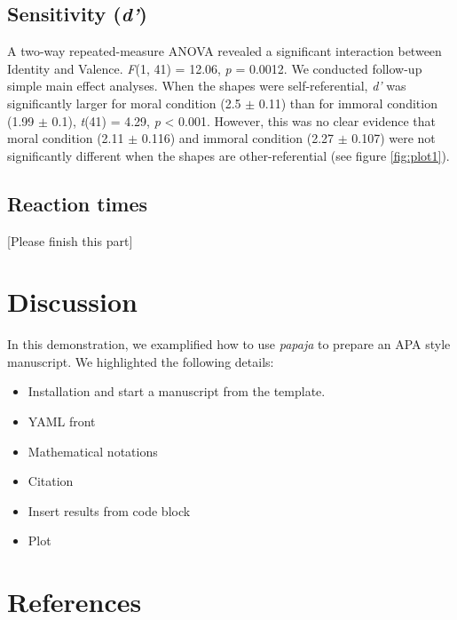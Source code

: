 \documentclass[
  man]{apa6}
\providecommand{\tightlist}{%
  \setlength{\itemsep}{0pt}\setlength{\parskip}{0pt}}
\begin{document}
\hypertarget{sensitivity-d}{%
\subsection{\texorpdfstring{Sensitivity (\emph{d'})}{Sensitivity (d')}}\label{sensitivity-d}}

A two-way repeated-measure ANOVA revealed a significant interaction between Identity and Valence. \emph{F}(1, 41) = 12.06, \emph{p} = 0.0012. We conducted follow-up simple main effect analyses. When the shapes were self-referential, \emph{d'} was significantly larger for moral condition (2.5 \(\pm\) 0.11) than for immoral condition (1.99 \(\pm\) 0.1), \emph{t}(41) = 4.29, \emph{p} \textless{} 0.001. However, this was no clear evidence that moral condition (2.11 \(\pm\) 0.116) and immoral condition (2.27 \(\pm\) 0.107) were not significantly different when the shapes are other-referential (see figure \ref{fig:plot1}).

\hypertarget{reaction-times}{%
\subsection{Reaction times}\label{reaction-times}}

{[}Please finish this part{]}

\hypertarget{discussion}{%
\section{Discussion}\label{discussion}}

In this demonstration, we examplified how to use \emph{papaja} to prepare an APA style manuscript. We highlighted the following details:

\begin{itemize}
\tightlist
\item
  Installation and start a manuscript from the template.
\item
  YAML front
\item
  Mathematical notations
\item
  Citation
\item
  Insert results from code block
\item
  Plot
\end{itemize}

\newpage

\hypertarget{references}{%
\section{References}\label{references}}
\end{document}
